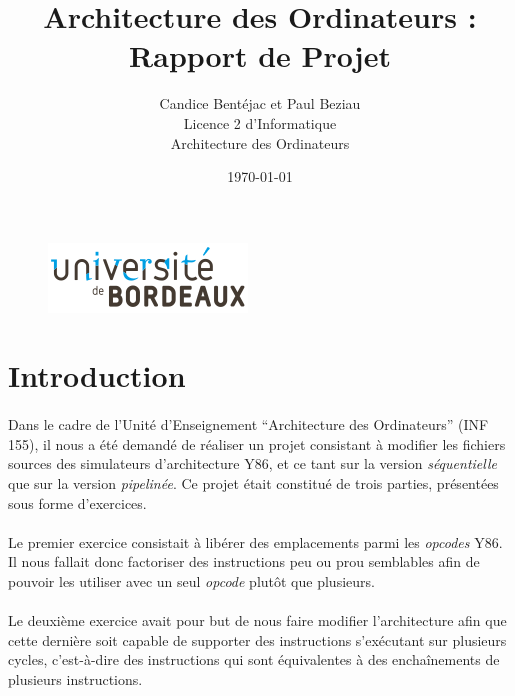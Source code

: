\documentclass[12pt]{article}
\title{Architecture des Ordinateurs : Rapport de Projet}
\author{Candice Bentéjac et Paul Beziau\\
  Licence 2 d'Informatique\\ 
  Architecture des Ordinateurs}
\date{\today}
\begin{document}
\begin{figure}
  \includegraphics{logo_ub.png}
  \end{figure}
\maketitle

\vspace{5\baselineskip}

\newpage

\tableofcontents
\newpage

\section*{Introduction}
\paragraph{}Dans le cadre de l'Unité d'Enseignement ``Architecture des Ordinateurs'' (INF 155), il nous a été demandé de réaliser un projet consistant à modifier les fichiers sources des simulateurs d'architecture Y86, et ce tant sur la version {\itshape séquentielle} que sur la version {\itshape pipelinée}. Ce projet était constitué de trois parties, présentées sous forme d'exercices.

\paragraph{}Le premier exercice consistait à libérer des emplacements parmi les {\itshape opcodes} Y86. Il nous fallait donc factoriser des instructions peu ou prou semblables afin de pouvoir les utiliser avec un seul {\itshape opcode} plutôt que plusieurs.

\paragraph{}Le deuxième exercice avait pour but de nous faire modifier l'architecture afin que cette dernière soit capable de supporter des instructions s'exécutant sur plusieurs cycles, c'est-à-dire des instructions qui sont équivalentes à des enchaînements de plusieurs instructions.
\end{document}
